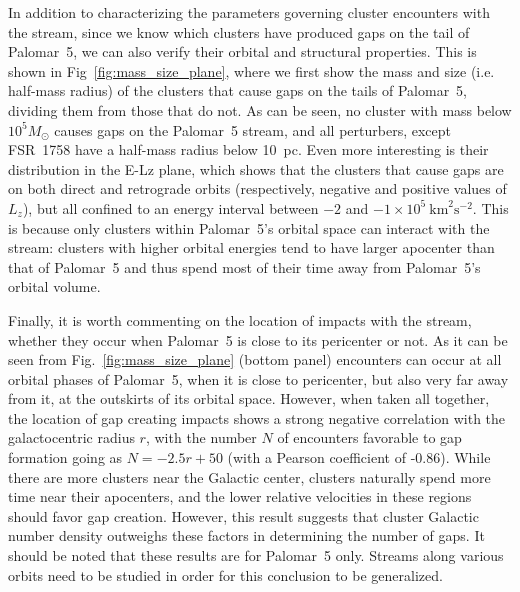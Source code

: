 \documentclass[draft]{aa}
\begin{document}
    In addition to characterizing the parameters governing cluster encounters with the stream, since we know which clusters have produced gaps on the tail of Palomar~5, we can also verify their orbital and structural properties. This is shown in Fig~\ref{fig:mass_size_plane}, where we first show the mass and size (i.e. half-mass radius) of the clusters that cause gaps on the tails of Palomar~5, dividing them from those that do not. As can be seen, no cluster with mass below $10^5 M_\odot$ causes gaps on the Palomar~5 stream, and all perturbers, except FSR~1758 have a half-mass radius below 10~pc. Even more interesting is their distribution in the E-Lz plane, which shows that the clusters that cause gaps are on both direct and retrograde orbits (respectively, negative and positive values of $L_z$), but all confined to an energy interval between $-2$ and $-1 \times10^5~\textrm{km}^2\textrm{s}^{-2}$. This is because only clusters within Palomar~5's orbital space can interact with the stream: clusters with higher orbital energies tend to have larger apocenter than that of Palomar~5 and thus spend most of their time away from Palomar~5's orbital volume. 
    
    Finally, it is worth commenting on the location of impacts with the stream, whether they occur when Palomar~5 is close to its pericenter or not. As it can be seen from Fig.~\ref{fig:mass_size_plane} (bottom panel) encounters can occur at all orbital phases of Palomar~5, when it is close to pericenter, but also very far away from it, at the outskirts of its orbital space. However, when taken all together, the location of gap creating impacts shows a strong negative correlation with the galactocentric radius $r$, with the number $N$ of encounters favorable to gap formation  going as $N = -2.5r + 50$ (with a Pearson coefficient of -0.86). While there are more clusters near the Galactic center, clusters naturally spend more time near their apocenters, and the lower relative velocities in these regions should favor gap creation. However, this result suggests that cluster Galactic number density outweighs these factors in determining the number of gaps. It should be noted that these results are for Palomar~5 only. Streams along various orbits need to be studied in order for this conclusion to be generalized. 

\end{document}
